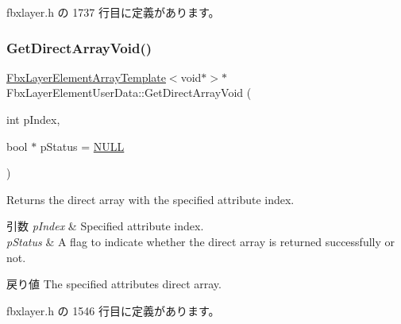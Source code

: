  fbxlayer.\+h の 1737 行目に定義があります。

\mbox{\label{class_fbx_layer_element_user_data_a8e1bfcb6d75d16a53275f69b1636d737}} 
\subsubsection{\texorpdfstring{Get\+Direct\+Array\+Void()}{GetDirectArrayVoid()}\hspace{0.1cm}{\footnotesize\ttfamily [1/4]}}
{\footnotesize\ttfamily \hyperlink{class_fbx_layer_element_array_template}{Fbx\+Layer\+Element\+Array\+Template}$<$void$\ast$$>$$\ast$ Fbx\+Layer\+Element\+User\+Data\+::\+Get\+Direct\+Array\+Void (\begin{DoxyParamCaption}\item[{int}]{p\+Index,  }\item[{bool $\ast$}]{p\+Status = {\ttfamily \hyperlink{fbxarch_8h_a070d2ce7b6bb7e5c05602aa8c308d0c4}{N\+U\+LL}} }\end{DoxyParamCaption})\hspace{0.3cm}{\ttfamily [inline]}}

Returns the direct array with the specified attribute index. 
\begin{DoxyParams}{引数}
{\em p\+Index} & Specified attribute index. \\
\hline
{\em p\+Status} & A flag to indicate whether the direct array is returned successfully or not. \\
\hline
\end{DoxyParams}
\begin{DoxyReturn}{戻り値}
The specified attribute\textquotesingle{}s direct array. 
\end{DoxyReturn}


 fbxlayer.\+h の 1546 行目に定義があります。

\mbox{\label{class_fbx_layer_element_user_data_a271bf5d91c8de1a35ffaef1404dd31db}} 
